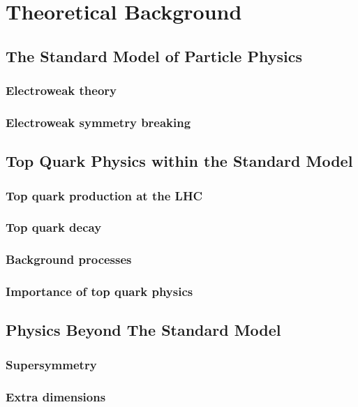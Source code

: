 
\chapter{Theoretical Background}
\label{c:theory}

\ifpdf
    \graphicspath{{02_Theory/plots/}}
\else
    \graphicspath{{02_Theory/plots/EPS/}{02_Theory/plots/}}
\fi

\section{The Standard Model of Particle Physics}
\label{s:SM}

\subsection{Electroweak theory}
\label{ss:electroweak_theory}

\subsection{Electroweak symmetry breaking}
\label{ss:electroweak_symmetry_breaking}

\section{Top Quark Physics within the Standard Model}
\label{s:top_quak_physics}

\subsection{Top quark production at the LHC}
\label{ss:top_production}

\subsection{Top quark decay}
\label{ss:top_decay}

\subsection{Background processes}
\label{ss:backgrounds}

\subsection{Importance of top quark physics}
\label{ss:importance}

\section{Physics Beyond The Standard Model}
\label{s:BSM}

\subsection{Supersymmetry}
\label{ss:SUSY}

\subsection{Extra dimensions}
\label{ss:extra_dimensions}




